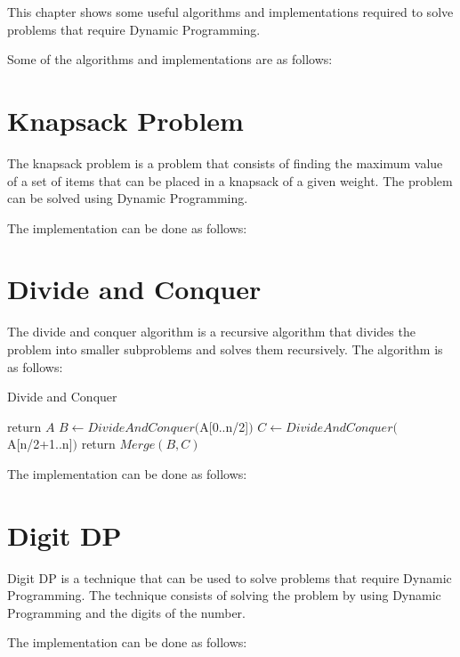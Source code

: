 This chapter shows some useful algorithms and implementations required to solve problems that require Dynamic Programming.

Some of the algorithms and implementations are as follows:

















\section{Knapsack Problem}

The knapsack problem is a problem that consists of finding the maximum value of a set of items that can be placed in a knapsack of a given weight. The problem can be solved using Dynamic Programming.

The implementation can be done as follows:





\section{Divide and Conquer}

The divide and conquer algorithm is a recursive algorithm that divides the problem into smaller subproblems and solves them recursively. The algorithm is as follows:

\begin{algorithm}
\caption{Divide and Conquer}
\label{alg:divideandconquer}
\begin{algorithmic}[1]
\State return $A$
\EndIf
\State $B \gets DivideAndConquer($A[0..n/2]$)$
\State $C \gets DivideAndConquer($A[n/2+1..n]$)$
\State return $Merge(B, C)$
\EndProcedure
\end{algorithmic}
\end{algorithm}

The implementation can be done as follows:



\section{Digit DP}

Digit DP is a technique that can be used to solve problems that require Dynamic Programming. The technique consists of solving the problem by using Dynamic Programming and the digits of the number.

The implementation can be done as follows:




